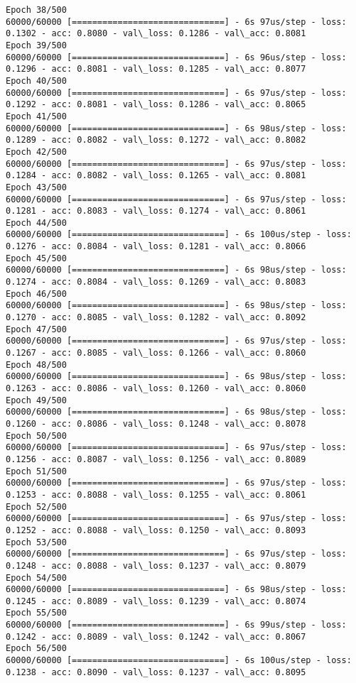 \documentclass[11pt]{article}
\begin{document}
\begin{Verbatim}[commandchars=\\\{\}]
Epoch 38/500
60000/60000 [==============================] - 6s 97us/step - loss: 0.1302 - acc: 0.8080 - val\_loss: 0.1286 - val\_acc: 0.8081
Epoch 39/500
60000/60000 [==============================] - 6s 96us/step - loss: 0.1296 - acc: 0.8081 - val\_loss: 0.1285 - val\_acc: 0.8077
Epoch 40/500
60000/60000 [==============================] - 6s 97us/step - loss: 0.1292 - acc: 0.8081 - val\_loss: 0.1286 - val\_acc: 0.8065
Epoch 41/500
60000/60000 [==============================] - 6s 98us/step - loss: 0.1289 - acc: 0.8082 - val\_loss: 0.1272 - val\_acc: 0.8082
Epoch 42/500
60000/60000 [==============================] - 6s 97us/step - loss: 0.1284 - acc: 0.8082 - val\_loss: 0.1265 - val\_acc: 0.8081
Epoch 43/500
60000/60000 [==============================] - 6s 97us/step - loss: 0.1281 - acc: 0.8083 - val\_loss: 0.1274 - val\_acc: 0.8061
Epoch 44/500
60000/60000 [==============================] - 6s 100us/step - loss: 0.1276 - acc: 0.8084 - val\_loss: 0.1281 - val\_acc: 0.8066
Epoch 45/500
60000/60000 [==============================] - 6s 98us/step - loss: 0.1274 - acc: 0.8084 - val\_loss: 0.1269 - val\_acc: 0.8083
Epoch 46/500
60000/60000 [==============================] - 6s 98us/step - loss: 0.1270 - acc: 0.8085 - val\_loss: 0.1282 - val\_acc: 0.8092
Epoch 47/500
60000/60000 [==============================] - 6s 97us/step - loss: 0.1267 - acc: 0.8085 - val\_loss: 0.1266 - val\_acc: 0.8060
Epoch 48/500
60000/60000 [==============================] - 6s 98us/step - loss: 0.1263 - acc: 0.8086 - val\_loss: 0.1260 - val\_acc: 0.8060
Epoch 49/500
60000/60000 [==============================] - 6s 98us/step - loss: 0.1260 - acc: 0.8086 - val\_loss: 0.1248 - val\_acc: 0.8078
Epoch 50/500
60000/60000 [==============================] - 6s 97us/step - loss: 0.1256 - acc: 0.8087 - val\_loss: 0.1256 - val\_acc: 0.8089
Epoch 51/500
60000/60000 [==============================] - 6s 97us/step - loss: 0.1253 - acc: 0.8088 - val\_loss: 0.1255 - val\_acc: 0.8061
Epoch 52/500
60000/60000 [==============================] - 6s 97us/step - loss: 0.1252 - acc: 0.8088 - val\_loss: 0.1250 - val\_acc: 0.8093
Epoch 53/500
60000/60000 [==============================] - 6s 97us/step - loss: 0.1248 - acc: 0.8088 - val\_loss: 0.1237 - val\_acc: 0.8079
Epoch 54/500
60000/60000 [==============================] - 6s 98us/step - loss: 0.1245 - acc: 0.8089 - val\_loss: 0.1239 - val\_acc: 0.8074
Epoch 55/500
60000/60000 [==============================] - 6s 99us/step - loss: 0.1242 - acc: 0.8089 - val\_loss: 0.1242 - val\_acc: 0.8067
Epoch 56/500
60000/60000 [==============================] - 6s 100us/step - loss: 0.1238 - acc: 0.8090 - val\_loss: 0.1237 - val\_acc: 0.8095

\end{Verbatim}
\end{document}
